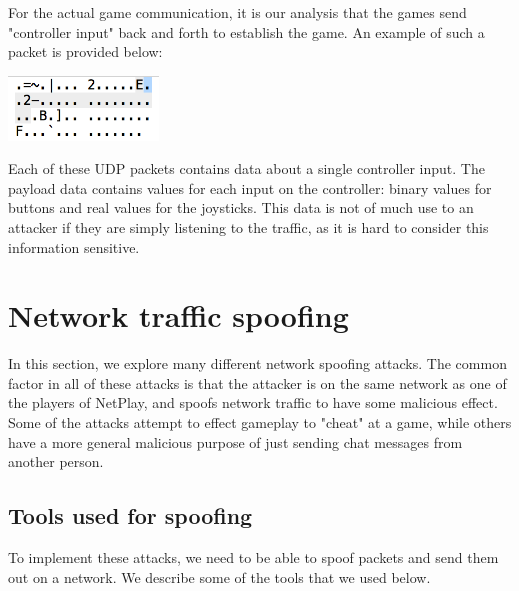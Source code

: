 \documentclass[conference]{IEEEtran}
\begin{document}
For the actual game communication, it is our analysis that the games send "controller input" back and forth to establish the game. An example of such a packet is provided below:
\vspace{0.5cm}
\begin{center}
\includegraphics[width=4cm]{Figures/Packet}
\end{center}
\vspace{0.5cm}

Each of these UDP packets contains data about a single controller input.
The payload data contains values for each input on the controller: binary values for buttons and real values for the joysticks.
This data is not of much use to an attacker if they are simply listening to the traffic, as it is hard to consider this information sensitive. 

\section{Network traffic spoofing}
In this section, we explore many different network spoofing attacks.
The common factor in all of these attacks is that the attacker is on the same network as one of the players of NetPlay, and spoofs network traffic to have some malicious effect.
Some of the attacks attempt to effect gameplay to "cheat" at a game, while others have a more general malicious purpose of just sending chat messages from another person.
\subsection{Tools used for spoofing}
To implement these attacks, we need to be able to spoof packets and send them out on a network. We describe some of the tools that we used below.
\end{document}
